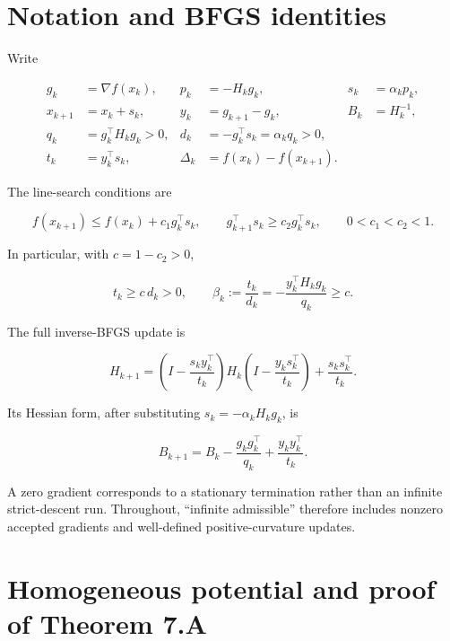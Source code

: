 \section{Notation and BFGS
identities}\label{H:notation-and-bfgs-identities}

Write

\[
\begin{aligned}
g_k&=\nabla f(x_k),&p_k&=-H_kg_k,&s_k&=\alpha_kp_k,\\
x_{k+1}&=x_k+s_k,&y_k&=g_{k+1}-g_k,&B_k&=H_k^{-1},\\
q_k&=g_k^\top H_kg_k>0,&d_k&=-g_k^\top s_k=\alpha_kq_k>0,\\
t_k&=y_k^\top s_k,&\Delta_k&=f(x_k)-f(x_{k+1}).
\end{aligned}
\]

The line-search conditions are

\[
f(x_{k+1})\le f(x_k)+c_1g_k^\top s_k,
\qquad
g_{k+1}^\top s_k\ge c_2g_k^\top s_k,
\qquad0<c_1<c_2<1.
\]

In particular, with \(c=1-c_2>0\),

\[
t_k\ge c\,d_k>0,
\qquad
\beta_k:=\frac{t_k}{d_k}
=-\frac{y_k^\top H_kg_k}{q_k}\ge c.
\]

The full inverse-BFGS update is

\[
H_{k+1}=
\left(I-\frac{s_ky_k^\top}{t_k}\right)
H_k
\left(I-\frac{y_ks_k^\top}{t_k}\right)
+\frac{s_ks_k^\top}{t_k}.
\]

Its Hessian form, after substituting \(s_k=-\alpha_kH_kg_k\), is

\[
\boxed{B_{k+1}=B_k-\frac{g_kg_k^\top}{q_k}
+\frac{y_ky_k^\top}{t_k}.}
\tag{7.2.1}
\]

A zero gradient corresponds to a stationary termination rather than an
infinite strict-descent run. Throughout, ``infinite admissible''
therefore includes nonzero accepted gradients and well-defined
positive-curvature updates.



\setcounter{section}{4}
\setcounter{theorem}{0}
\setcounter{lemma}{0}
\setcounter{corollary}{0}
\setcounter{proposition}{0}
\setcounter{remark}{0}
\setcounter{equation}{0}


\section{Homogeneous potential and proof of Theorem
7.A}\label{H:homogeneous-potential-and-proof-of-theorem-a}


